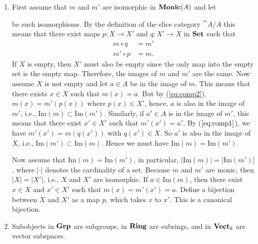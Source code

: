 \documentclass[11pt,a4paper]{article}
\begin{document}
\begin{solution}\leavevmode
    \begin{enumerate}[label=(\alph*)]
        \item First assume that $m$ and $m'$ are isomorphic in $\mathbf{Monic}(A)$ and let  be such isomorphisms. By the definition of the slice category $\cat{A}/A$ this means that there exist maps $p:X\to X'$ and $q:X'\to X$ in $\mathbf{Set}$ such that 
        \begin{align}
            m\circ q&=m'\label{eq:comp1}\\
            m'\circ p&=m\label{eq:comp2}.
        \end{align}
        If $X$ is empty, then $X'$ must also be empty since the only map into the empty set is the empty map. Therefore, the images of $m$ and $m'$ are the same. Now assume $X$ is not empty and let $a\in A$ be in the image of $m$. This means that there exists $x\in X$ such that $m(x)=a$. But by (\ref{eq:comp2}), $m(x)=m'(p(x))$ where $p(x)\in X'$, hence, $a$ is also in the image of $m'$, i.e., $\text{Im}(m)\subset\text{Im}(m')$. Similarly, if $a'\in A$ is in the image of $m'$, this means that there exist $x'\in X'$ such that $m'(x')=a'$. By ($\ref{eq:comp1}$), we have $m'(x')=m(q(x'))$ with $q(x')\in X$. So $a'$ is also in the image of $X$, i.e., $\text{Im}(m')\subset\text{Im}(m)$. Hence we must have $\text{Im}(m)=\text{Im}(m')$.\par
        Now assume that $\text{Im}(m)=\text{Im}(m')$, in particular, $\vert\text{Im}(m)\vert = \vert\text{Im}(m')\vert$, where $\vert\cdot\vert$ denotes the cardinality of a set. Because $m$ and $m'$ are monic, then $\vert X\vert = \vert X'\vert$, i.e., $X$ and $X'$ are isomorphic. If $a\in\text{Im}(m)$, then there exist $x\in X$ and $x'\in X'$ such that $m(x)=m'(x')=a$. Define a bijection between $X$ and $X'$ as a map $p$, which takes $x$ to $x'$. This is a canonical bijection.
        \item Subobjects in $\mathbf{Grp}$ are subgroups, in $\mathbf{Ring}$ are subrings, and in $\mathbf{Vect}_k$ are vector subspaces.
    \end{enumerate}
\end{solution}
\end{document}
